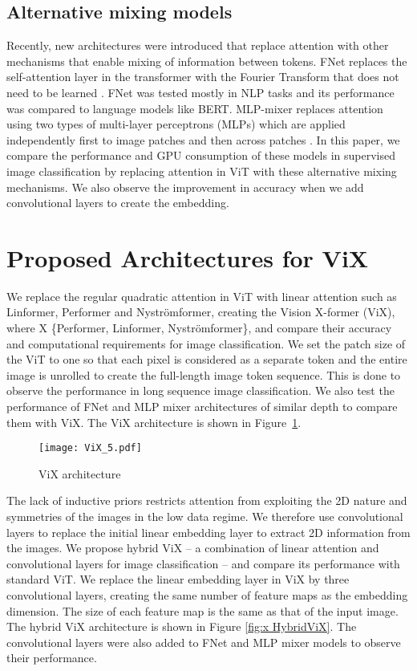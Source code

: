 \documentclass{article}
\begin{document}
\subsection{Alternative mixing models}
Recently, new architectures were introduced that replace attention with other mechanisms that enable mixing of information between tokens. FNet replaces the self-attention layer in the transformer with the Fourier Transform that does not need to be learned \cite{leethorp2021fnet}. FNet was tested mostly in NLP tasks and its performance was compared to language models like BERT. MLP-mixer replaces attention using two types of multi-layer perceptrons (MLPs) which are applied independently first to image patches and then across patches \cite{tolstikhin2021mlpmixer}. In this paper, we compare the performance and GPU consumption of these models in supervised image classification by replacing attention in ViT with these alternative mixing mechanisms. We also observe the improvement in accuracy when we add convolutional layers to create the embedding.



\section{Proposed Architectures for ViX}    


We replace the regular quadratic attention in ViT with linear attention such as Linformer, Performer and Nyströmformer, creating the Vision X-former (ViX), where X  \{Performer, Linformer, Nyströmformer\}, and compare their accuracy and computational requirements for image classification. We set the patch size of the ViT to one so that each pixel is considered as a separate token and the entire image is unrolled to create the full-length image token sequence. This is done to observe the performance in long sequence image classification. We also test the performance of FNet and MLP mixer architectures of similar depth to compare them with ViX. The ViX architecture is shown in Figure~\ref{fig:x ViX}.

\begin{figure}[h]
\centering
\texttt{[image: ViX\_5.pdf]}
\caption{ViX architecture}
\label{fig:x ViX}
\end{figure}

The lack of inductive priors restricts attention from exploiting the 2D nature and symmetries of the images in the low data regime. We therefore use convolutional layers to replace the initial linear embedding layer to extract 2D information from the images. We propose hybrid ViX -- a combination of linear attention and convolutional layers for image classification -- and compare its performance with standard ViT. We replace the linear embedding layer in ViX by three convolutional layers, creating the same number of feature maps as the embedding dimension. The size of each feature map is the same as that of the input image. The hybrid ViX architecture is shown in Figure \ref{fig:x HybridViX}. The convolutional layers were also added to FNet and MLP mixer models to observe their performance.
\end{document}
